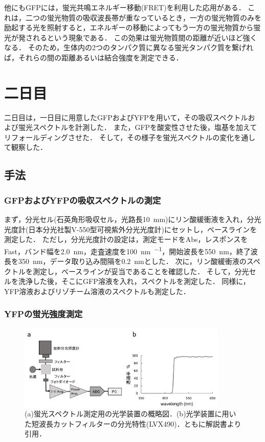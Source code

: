 \documentclass[a4paper,11pt, titlepage]{jsarticle}
\begin{document}
他にもGFPには，蛍光共鳴エネルギー移動(FRET)を利用した応用がある．
これは，二つの蛍光物質の吸収波長帯が重なっているとき，一方の蛍光物質のみを励起する光を照射すると，エネルギーの移動によってもう一方の蛍光物質から蛍光が発されるという現象である．
この効果は蛍光物質間の距離が近いほど強くなる．
そのため，生体内の2つのタンパク質に異なる蛍光タンパク質を繋げれば，それらの間の距離あるいは結合強度を測定できる．

\section{二日目}
二日目は，一日目に用意したGFPおよびYFPを用いて，その吸収スペクトルおよび蛍光スペクトルを計測した．
また，GFPを酸変性させた後，塩基を加えてリフォールディングさせた．
そして，その様子を蛍光スペクトルの変化を通して観察した．

\subsection{手法}
\subsubsection{GFPおよびYFPの吸収スペクトルの測定}
まず，分光セル(石英角形吸収セル，光路長\SI{10}{\mm})にリン酸緩衝液を入れ，分光光度計(日本分光社製V-550型可視紫外分光光度計)にセットし，ベースラインを測定した．
ただし，分光光度計の設定は，測定モードをAbs，レスポンスをFast，バンド幅を\SI{2.0}{\nm}，走査速度を\SI{100}{\nm\per\min}，開始波長を\SI{550}{\nm}，終了波長を\SI{350}{\nm}，データ取り込み間隔を\SI{0.2}{\nm}とした．
次に，リン酸緩衝液のスペクトルを測定し，ベースラインが妥当であることを確認した．
そして，分光セルを洗浄した後，そこにGFP溶液を入れ，スペクトルを測定した．
同様に，YFP溶液およびリゾチーム溶液のスペクトルも測定した．

\subsubsection{YFPの蛍光強度測定}

\begin{figure}[htbp]
    \centering
    \includegraphics[width=10cm]{optical_system.png}
    \caption{(a)蛍光スペクトル測定用の光学装置の概略図．(b)光学装置に用いた短波長カットフィルターの分光特性(LVX490)．ともに解説書より引用．}
    \label{fig:optical_system}
\end{figure}
\end{document}
